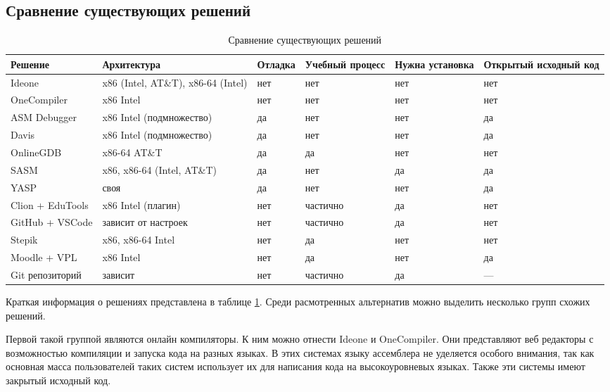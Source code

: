 \documentclass[a4paper,article,14pt]{extarticle}
\begin{document}
\subsection{Сравнение существующих решений}

\begin{table}[ht]
\small
    \begin{tabular}{|p{3.1cm}|p{2.4cm}|p{2cm}|p{2cm}|p{2cm}|p{2cm}|}
    \hline
    \textbf{Решение} & \textbf{Архитектура} & \textbf{Отладка} & \textbf{Учебный процесс} & \textbf{Нужна установка} & \textbf{Открытый исходный код} \\
    \hline
    Ideone & x86 (Intel, AT\&T), x86-64 (Intel) & нет & нет & нет & нет \\ \hline
    OneCompiler & x86 Intel & нет & нет & нет & нет \\ \hline
    ASM Debugger & x86 Intel (подмножество) & да & нет & нет & да \\ \hline
    Davis & x86 Intel (подмножество) & да & нет & нет & да \\ \hline
    OnlineGDB & x86-64 AT\&T & да & да & нет & нет \\ \hline
    SASM & x86, x86-64 (Intel, AT\&T) & да & нет & да & да \\ \hline
    YASP & своя & да & нет & нет & да \\ \hline
    Clion + EduTools & x86 Intel (плагин) & нет & частично & да & нет \\ \hline
    GitHub + VSCode & зависит от настроек & нет & частично & да & нет \\ \hline
    Stepik & x86, x86-64 Intel & нет & да & нет & нет \\ \hline
    Moodle + VPL & x86 Intel & нет & да & нет & да \\ \hline
    Git репозиторий & зависит & нет & частично & да & --- \\ \hline
    \end{tabular}
\caption{\label{table:alternatives}Сравнение существующих решений}
\normalsize
\end{table}

Краткая информация о решениях представлена в таблице \ref{table:alternatives}. Среди расмотренных альтернатив можно выделить несколько групп схожих решений.

Первой такой группой являются онлайн компиляторы. К ним можно отнести Ideone и OneCompiler. Они представляют веб редакторы с возможностью компиляции и запуска кода на разных языках. В этих системах языку ассемблера не уделяется особого внимания, так как основная масса пользователей таких систем использует их для написания кода на высокоуровневых языках. Также эти системы имеют закрытый исходный код.
\end{document}
